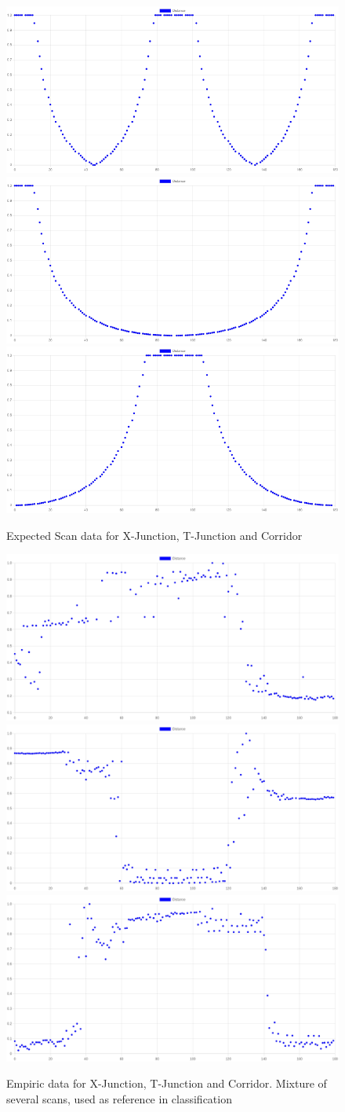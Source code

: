 \begin{figure}
    \centering
    \includegraphics[width=0.45\linewidth]{figures/x_graph.png}
    \includegraphics[width=0.45\linewidth]{figures/t_graph.png}
    \includegraphics[width=0.45\linewidth]{figures/c_graph.png}
    \caption{Expected Scan data for X-Junction, T-Junction and Corridor}

    \label{fig:theory}
\end{figure}

\begin{figure}
    \centering
    \includegraphics[width=0.45\linewidth]{figures/x_graph_empiric.png}
    \includegraphics[width=0.45\linewidth]{figures/t_graph_empiric.png}
    \includegraphics[width=0.45\linewidth]{figures/c_graph_empiric.png}
    \caption{Empiric data for X-Junction, T-Junction and Corridor.
        Mixture of several scans, used as reference in classification}

    \label{fig:actual}
\end{figure}

